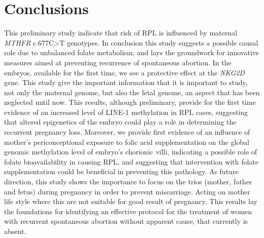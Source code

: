 \documentclass[journal,article,submit,moreauthors,pdftex]{Definitions/mdpi}
\begin{document}
\section{Conclusions}


\noindent This preliminary study indicate that risk of RPL is influenced by maternal \textit{MTHFR} c.677C>T genotypes. In conclusion this study suggests a possible causal role due to unbalanced folate metabolism, and lays the groundwork for innovative measures aimed at preventing recurrence of spontaneous abortion. In the embryos, available for the first time, we see a protective effect at the \textit{NKG2D} gene. This study give the important information that it is important to study, not only the maternal genome, but also the fetal genome, an aspect that has been neglected until now. This results, although preliminary, provide for the first time evidence of an increased level of LINE-1 methylation in RPL cases, suggesting that altered epigenetics of the embryo could play a role in determining the recurrent pregnancy loss. Moreover, we provide first evidence of an influence of mother’s periconceptional exposure to folic acid supplementation on the global genomic methylation level of embryo’s chorionic villi, indicating a possible role of folate bioavailability in causing RPL, and suggesting that intervention with folate supplementation could be beneficial in preventing this pathology. As future direction, this study shows the importance to focus on the trios (mother, father and fetus) during pregnancy in order to prevent miscarriage. Acting on mother life style where this are not suitable for good result of pregnancy. This results lay the foundations for identifying an effective protocol for the treatment of women with recurrent spontaneous abortion without apparent cause, that currently is absent.


\vspace{6pt} 
\end{document}
